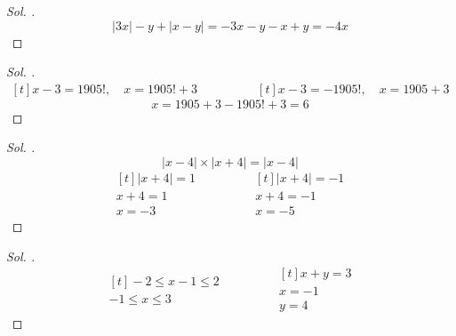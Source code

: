 \documentclass{article}
\theoremstyle{mytheoremstyle}
\theoremstyle{mytheoremstyle}
\theoremstyle{myproblemstyle}
\begin{document}
\begin{problem}
\end{problem}

\begin{proof}[\textit{ Sol. }]
  $$ |3x| - y + |x - y| = -3x - y - x + y = -4x $$
\end{proof}

\begin{problem}[$ |x - 3| = 1905! $ ise $ x $ değerleri toplamı?]
\end{problem}

\begin{proof}[\textit{ Sol. }]
  \begin{equation*}
    \begin{aligned}[t]
      x - 3 = 1905!,\quad x = 1905! + 3
    \end{aligned}
    \qquad\qquad
    \begin{aligned}[t]
      x - 3 = -1905!,\quad x = 1905 + 3
    \end{aligned}
  \end{equation*}
  $$ x = 1905 + 3 -1905! + 3 = 6 $$
\end{proof}

\begin{problem}[$ |x^2 - 16| = |x - 4| $ denklemeni sağlayan $ x $ değerleri toplamı?]
\end{problem}

\begin{proof}[\textit{ Sol. }]
  $$ |x - 4| \times |x + 4| = |x - 4| $$
  \begin{equation*}
    \begin{aligned}[t]
      |x + 4| = 1\\
      x + 4 = 1\\
      x = -3
    \end{aligned}
    \qquad\qquad
    \begin{aligned}[t]
      |x + 4| = -1\\
      x + 4 = -1\\
      x = -5
    \end{aligned}
  \end{equation*}
\end{proof}

\begin{problem}[$ |x - 1| \le 2 $, $ x + y - 3 = 0 $, $ y $'nin en büyük değeri?]
\end{problem}

\begin{proof}[\textit{ Sol. }]
  \begin{equation*}
    \begin{aligned}[t]
      -2 \le x - 1 \le 2\\
      -1 \le x \le 3
    \end{aligned}
    \qquad\qquad
    \begin{aligned}[t]
      x + y = 3\\
      x = -1\\
      y = 4
    \end{aligned}
  \end{equation*}
\end{proof}
\end{document}
